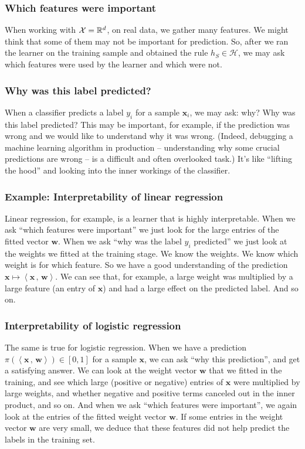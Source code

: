 \documentclass[11pt]{article}
\newcommand{\Hc}{\mathcal{H}}
\newcommand{\innerr}[2]{{\left\langle #1\,,\,#2 \right\rangle}}
\newcommand{\VV}[1]{\mathbf{#1}}
\begin{document}
\subsubsection{Which features were important}
When working with $\mathcal{X}=\mathbb{R}^d$, on real data, we gather many features. We might
think that some of them may not be important for prediction. So, after we ran
the learner on the training sample and obtained the rule $h_S\in\Hc$, we may ask
which features were used by the learner and which were not.

\subsubsection{Why was this label predicted?}

When a classifier predicts a label 
$y_i$ for a sample $\VV{x}_i$, we may ask: why? Why was this label predicted?
This may be important, for example, if the prediction was wrong and we would
like to understand why it was wrong. (Indeed, debugging a machine learning
  algorithm in production -- understanding why some crucial predictions are
wrong -- is a difficult and often overlooked task.) 
It's like ``lifting the hood'' and looking
into the inner workings of the classifier. 

\subsubsection{Example: Interpretability of linear regression}
Linear regression, for example, is a learner that is highly interpretable. When
we ask ``which features were important'' we just look for the large entries of
the fitted vector $\VV{w}$. When
we ask ``why was the label $y_i$ predicted'' we just look at the weights we
fitted at the training stage. We know the weights. We know which weight is for
which feature. So we have a good understanding of the prediction
$\VV{x}\mapsto\innerr{\VV{x}}{\VV{w}}$. We can see that, for example, a large
weight was multiplied by a large feature (an entry of $\VV{x}$) and had a large
effect on the predicted label. And so on. 

\subsubsection{Interpretability of logistic regression}

The same is true for logistic regression. When we have a prediction 
$\pi(\innerr{\VV{x}}{\VV{w}})\in [0,1]$ for a sample
$\VV{x}$, we can ask ``why this prediction'', and get a satisfying answer. We
can look at the weight vector $\VV{w}$ that we fitted in the training, and see
which large (positive or negative) entries of $\VV{x}$ were multiplied by large
weights, and whether negative and positive terms canceled out in the inner
product, and so on. And when we ask ``which features were important'', we again
look at the entries of the fitted weight vector $\VV{w}$. If some entries in the weight vector $\VV{w}$ are very
small, we deduce that these features did not help predict the labels in the
training set. 
\end{document}
